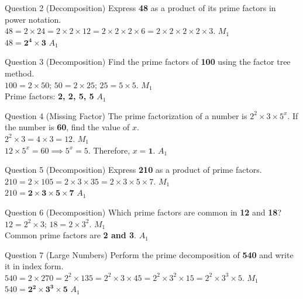 \documentclass[12pt, a4paper, oneside]{article}
\begin{document}
\begin{solvingbox}{Question 2 (Decomposition)}
Express \textbf{48} as a product of its prime factors in power notation. \\
$48 = 2 \times 24 = 2 \times 2 \times 12 = 2 \times 2 \times 2 \times 6 = 2 \times 2 \times 2 \times 2 \times 3$. \hfill $M_1$ \\
$48 = \mathbf{2^4 \times 3}$ \hfill $A_1$
\end{solvingbox}

\begin{solvingbox}{Question 3 (Decomposition)}
Find the prime factors of \textbf{100} using the factor tree method. \\
$100 = 2 \times 50$; $50 = 2 \times 25$; $25 = 5 \times 5$. \hfill $M_1$ \\
Prime factors: \textbf{2, 2, 5, 5} \hfill $A_1$
\end{solvingbox}

\begin{solvingbox}{Question 4 (Missing Factor)}
The prime factorization of a number is $2^2 \times 3 \times 5^x$. If the number is \textbf{60}, find the value of $x$. \\
$2^2 \times 3 = 4 \times 3 = 12$. \hfill $M_1$ \\
$12 \times 5^x = 60 \implies 5^x = 5$. Therefore, $x = \mathbf{1}$. \hfill $A_1$
\end{solvingbox}

\newpage

\begin{solvingbox}{Question 5 (Decomposition)}
Express \textbf{210} as a product of prime factors. \\
$210 = 2 \times 105 = 2 \times 3 \times 35 = 2 \times 3 \times 5 \times 7$. \hfill $M_1$ \\
$210 = \mathbf{2 \times 3 \times 5 \times 7}$ \hfill $A_1$
\end{solvingbox}

\begin{solvingbox}{Question 6 (Decomposition)}
Which prime factors are common in \textbf{12} and \textbf{18}? \\
$12 = 2^2 \times 3$; $18 = 2 \times 3^2$. \hfill $M_1$ \\
Common prime factors are \textbf{2 and 3}. \hfill $A_1$
\end{solvingbox}

\begin{solvingbox}{Question 7 (Large Numbers)}
Perform the prime decomposition of \textbf{540} and write it in index form. \\
$540 = 2 \times 270 = 2^2 \times 135 = 2^2 \times 3 \times 45 = 2^2 \times 3^2 \times 15 = 2^2 \times 3^3 \times 5$. \hfill $M_1$ \\
$540 = \mathbf{2^2 \times 3^3 \times 5}$ \hfill $A_1$
\end{solvingbox}
\end{document}

